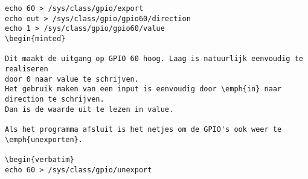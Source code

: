 \begin{verbatim}
echo 60 > /sys/class/gpio/export
echo out > /sys/class/gpio/gpio60/direction
echo 1 > /sys/class/gpio/gpio60/value
\begin{minted}

Dit maakt de uitgang op GPIO 60 hoog. Laag is natuurlijk eenvoudig te realiseren
door 0 naar value te schrijven.
Het gebruik maken van een input is eenvoudig door \emph{in} naar direction te schrijven.
Dan is de waarde uit te lezen in value.

Als het programma afsluit is het netjes om de GPIO's ook weer te \emph{unexporten}.

\begin{verbatim}
echo 60 > /sys/class/gpio/unexport
\end{verbatim}

